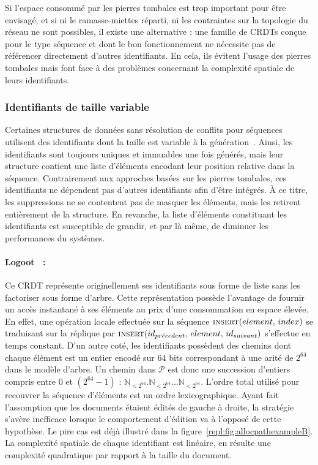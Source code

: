 Si l'espace consommé par les pierres tombales est trop important pour être
envisagé, et si ni le ramasse-miettes réparti, ni les contraintes sur la
topologie du réseau ne sont possibles, il existe une alternative : une famille
de CRDTs conçue pour le type séquence et dont le bon fonctionnement ne nécessite
pas de référencer directement d'autres identifiants. En cela, ils évitent
l'usage des pierres tombales mais font face à des problèmes concernant la
complexité spatiale de leurs identifiants.

\subsubsection{Identifiants de taille variable}

Certaines structures de données sans résolution de conflits pour séquences
utilisent des identifiants dont la taille est variable à la
génération~\cite{andre2013supporting, preguica2009commutative,
  weiss2009logoot}. Ainsi, les identifiants sont toujours uniques et immuables
une fois générés, mais leur structure contient une liste d'éléments encodant
leur position relative dans la séquence.  Contrairement aux approches basées sur
les pierres tombales, ces identifiants ne dépendent pas d'autres identifiants
afin d'être intégrés. À ce titre, les suppressions ne se contentent pas de
masquer les éléments, mais les retirent entièrement de la structure. En
revanche, la liste d'éléments constituant les identifiants est susceptible de
grandir, et par là même, de diminuer les performances du systèmes.

\paragraph{Logoot~\cite{weiss2010collaborative, weiss2009logoot,
    weiss2010logootundo} :} Ce CRDT représente originellement ses identifiants
sous forme de liste sans les factoriser sous forme d'arbre. Cette représentation
possède l'avantage de fournir un accès instantané à ses éléments au prix d'une
consommation en espace élevée. En effet, une opération locale effectuée sur la
séquence $\textsc{insert}(element,\, index)$ se traduisant sur la réplique par
$\textsc{insert}(id_{pr\acute{e}cedent},\, element,\, id_{suivant})$ s'effectue
en temps constant. D'un autre coté, les identifiants possèdent des chemins dont
chaque élément est un entier encodé sur 64 bits correspondant à une arité de
$2^{64}$ dans le modèle d'arbre. Un chemin dans $\mathcal{P}$ est donc une
succession d'entiers compris entre 0 et $(2^{64}-1)$ :
$\mathbb{N}_{<2^{64}}.\mathbb{N}_{<2^{64}}\ldots\mathbb{N}_{<2^{64}}$.  L'ordre
total utilisé pour recouvrer la séquence d'éléments est un ordre
lexicographique. Ayant fait l'assomption que les documents étaient édités de
gauche à droite, la stratégie s'avère inefficace lorsque le comportement
d'édition va à l'opposé de cette hypothèse. Le pire cas est déjà illustré dans
la figure~\ref{repl:fig:allocpathexampleB}. La complexité spatiale de chaque
identifiant est linéaire, en résulte une complexité quadratique par rapport à la
taille du document.

